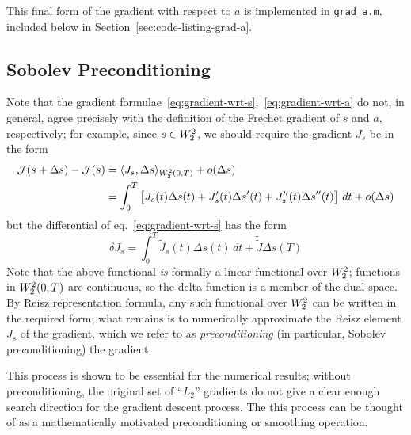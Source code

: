\documentclass[letterpaper, 10pt, draft]{amsart}
\theoremstyle{definition}
\theoremstyle{remark}
\begin{document}
This final form of the gradient with respect to $a$ is implemented in
\verb+grad_a.m+, included below in Section~\ref{sec:code-listing-grad-a}.

\subsection{Sobolev Preconditioning}
Note that the gradient
formulae~\eqref{eq:gradient-wrt-s},~\eqref{eq:gradient-wrt-a} do not, in
general, agree precisely with the definition of the Frechet gradient of $s$ and
$a$, respectively; for example, since $s \in W_2^2$, we should require
the gradient $J_s$ be in the form
\begin{align*}
  \mathcal{J}(s+{\Delta s}) - \mathcal{J}(s)
  & = \langle J_s, {\Delta s} \rangle_{W_2^2(0,T)}
  + o({\Delta s})
  \\
  & = \int_0^T \left[
    J_s(t) {\Delta s}(t)
    + J_s'(t) {\Delta s}'(t)
    + J_s''(t) {\Delta s}''(t)
    \right]\,dt
    + o({\Delta s})
\end{align*}
but the differential of eq.~\eqref{eq:gradient-wrt-s} has the form
\[
  {\delta J}_s = \int_0^T \tilde{J}_s(t) {\Delta s}(t) \,dt + \tilde{\tilde{J}} {\Delta s}(T)
\]
Note that the above functional \emph{is} formally a linear functional over
$W_2^2{}$; functions in $W_2^2(0,T)$ are continuous, so the
delta function is a member of the dual space.
By Reisz representation formula, any such functional over $W_2^2$ can
be written in the required form; what remains is to numerically approximate the
Reisz element $J_s$ of the gradient, which we refer to as \emph{preconditioning}
(in particular, Sobolev preconditioning) the gradient.

This process is shown to be essential for the numerical results; without
preconditioning, the original set of ``$L_2$'' gradients do not give a clear
enough search direction for the gradient descent process.
The this process can be thought of as a mathematically motivated preconditioning
or smoothing operation.
\end{document}
